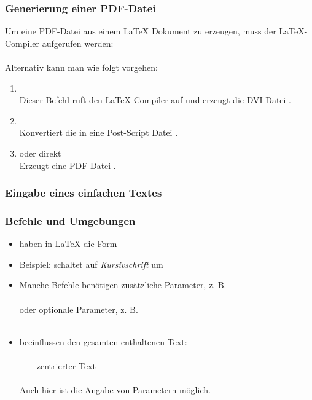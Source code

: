 \begin{frame}[fragile]
	\frametitle{Generierung einer PDF-Datei}
    Um eine PDF-Datei aus einem \LaTeX{} Dokument  zu erzeugen, muss der \LaTeX-Compiler aufgerufen werden:\\
	 \\[1cm]
Alternativ kann man wie folgt vorgehen:
	\begin{enumerate}
		\item {}\\
		Dieser Befehl ruft den \LaTeX-Compiler auf und erzeugt die DVI-Datei .
		\item {}\\
		Konvertiert die  in eine Post-Script Datei .
		\item {} oder direkt \\
		Erzeugt eine PDF-Datei .
	\end{enumerate}
\end{frame}

\begin{frame}
	\frametitle{Eingabe eines einfachen Textes}
	
\end{frame}

\begin{frame}
	\frametitle{Befehle und Umgebungen}
	\begin{itemize}
        \item {} haben in \LaTeX{} die Form 
		\item Beispiel:  schaltet auf {\it Kursivschrift} um
		\item Manche Befehle benötigen zusätzliche Parameter, z. B.\\
		\\
		oder optionale Parameter, z. B.\\
		\\[1cm]
		\item {} beeinflussen den gesamten enthaltenen Text:\\
		 \\
		~~~~zentrierter Text\\
		\\
		Auch hier ist die Angabe von Parametern möglich.
	\end{itemize}
\end{frame}
